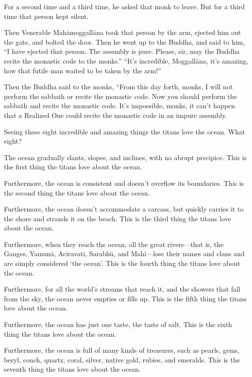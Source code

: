\documentclass[12pt,openany]{book}%
\begin{document}
For a second time and a third time, he asked that monk to leave. But for a third time that person kept silent. 

Then Venerable \textsanskrit{Mahāmoggallāna} took that person by the arm, ejected him out the gate, and bolted the door. Then he went up to the Buddha, and said to him, “I have ejected that person. The assembly is pure. Please, sir, may the Buddha recite the monastic code to the monks.” “It’s incredible, \textsanskrit{Moggallāna}, it’s amazing, how that futile man waited to be taken by the arm!” 

Then the Buddha said to the monks, “From this day forth, monks, I will not perform the sabbath or recite the monastic code. Now you should perform the sabbath and recite the monastic code. It’s impossible, monks, it can’t happen that a Realized One could recite the monastic code in an impure assembly. 

Seeing these eight incredible and amazing things the titans love the ocean. What eight? 

The ocean gradually slants, slopes, and inclines, with no abrupt precipice. This is the first thing the titans love about the ocean. 

Furthermore, the ocean is consistent and doesn’t overflow its boundaries. This is the second thing the titans love about the ocean. 

Furthermore, the ocean doesn’t accommodate a carcass, but quickly carries it to the shore and strands it on the beach. This is the third thing the titans love about the ocean. 

Furthermore, when they reach the ocean, all the great rivers—that is, the Ganges, \textsanskrit{Yamunā}, \textsanskrit{Aciravatī}, \textsanskrit{Sarabhū}, and \textsanskrit{Mahī}—lose their names and clans and are simply considered ‘the ocean’. This is the fourth thing the titans love about the ocean. 

Furthermore, for all the world’s streams that reach it, and the showers that fall from the sky, the ocean never empties or fills up. This is the fifth thing the titans love about the ocean. 

Furthermore, the ocean has just one taste, the taste of salt. This is the sixth thing the titans love about the ocean. 

Furthermore, the ocean is full of many kinds of treasures, such as pearls, gems, beryl, conch, quartz, coral, silver, native gold, rubies, and emeralds. This is the seventh thing the titans love about the ocean. 
\end{document}
